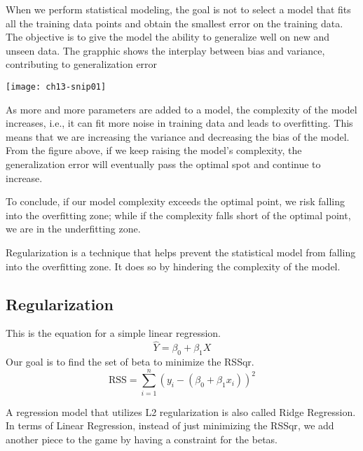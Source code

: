 When we perform statistical modeling, the goal is not to select a model that fits all the training data points and obtain the smallest error on the training data. The objective is to give the model the ability to generalize well on new and unseen data.
The grapphic shows the interplay between bias and variance, contributing to generalization error \cite{DanielSaunders2017}
\begin{marginfigure}
\texttt{[image: ch13-snip01]}
\end{marginfigure}

As more and more parameters are added to a model, the complexity of the model increases, i.e., it can fit more noise in training data and leads to overfitting. This means that we are increasing the variance and decreasing the bias of the model. From the figure above, if we keep raising the model's complexity, the generalization error will eventually pass the optimal spot and continue to increase.

To conclude, if our model complexity exceeds the optimal point, we risk falling into the overfitting zone; while if the complexity falls short of the optimal point, we are in the underfitting zone.

Regularization is a technique that helps prevent the statistical model from falling into the overfitting zone. It does so by hindering the complexity of the model.

\subsection{Regularization}


This is the equation for a simple linear regression.
\begin{equation}
\hat{Y}=\beta_{0}+\beta_{1} X
\end{equation}
Our goal is to find the set of beta to minimize the \ac{RSSqr}.
\begin{equation}
\textrm{RSS}=\sum_{i=1}^{n}\left(y_{i}-\left(\beta_{0}+\beta_{1} x_{i}\right)\right)^{2}
\end{equation}




A regression model that utilizes L2 regularization is also called Ridge Regression. In terms of Linear Regression, instead of just minimizing the \ac{RSSqr}, we add another piece to the game by having a constraint for the betas.

